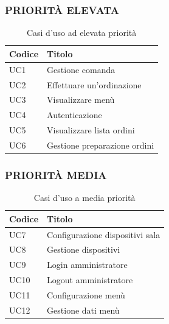 \clearpage
\subsubsection{PRIORITÀ ELEVATA}

\begin{table}[htbp]
	\centering
	 \begin{tabularx}{\textwidth}{|>{\centering\arraybackslash} m{4em}| >{\raggedright\arraybackslash}X |}
		\hline
		\textbf{Codice} & \textbf{Titolo} \\ [0.5ex]
		\hline\hline
		UC1 & Gestione comanda  \\
		\hline
		UC2 & Effettuare un'ordinazione \\
		\hline
		UC3 & Visualizzare menù \\
		\hline
		UC4 & Autenticazione \\
		\hline
		UC5 & Visualizzare lista ordini \\
		\hline
		UC6 & Gestione preparazione ordini \\
		\hline
	\end{tabularx}
	\caption{Casi d'uso ad elevata priorità}
	\label{tab:use_cases_high_priority}
\end{table}

\subsubsection{PRIORITÀ MEDIA}
\begin{table}[htbp]
	\centering
	\begin{tabularx}{\textwidth}{|>{\centering\arraybackslash} m{4em}| >{\raggedright\arraybackslash}X |}
		\hline
		\textbf{Codice} & \textbf{Titolo} \\ [0.5ex]
		\hline\hline
		UC7 & Configurazione dispositivi sala \\
		\hline
		UC8 & Gestione dispositivi \\
		\hline
		UC9 & Login amministratore \\
		\hline
		UC10 & Logout amministratore \\
		\hline
		UC11 & Configurazione menù \\
		\hline
		UC12 & Gestione dati menù \\
		\hline
	\end{tabularx}
	\caption{Casi d'uso a media priorità}
	\label{tab:use_cases_medium_priority}
\end{table}

